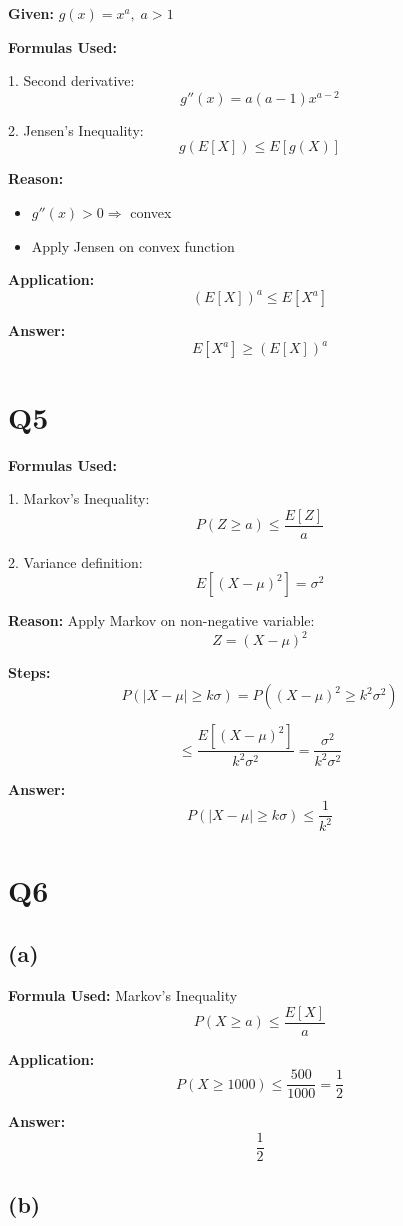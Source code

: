 \documentclass[12pt]{article}
\begin{document}
\textbf{Given:} $g(x) = x^a,\; a > 1$

\textbf{Formulas Used:}

1. Second derivative:
\[
g''(x) = a(a-1)x^{a-2}
\]

2. Jensen’s Inequality:
\[
g(E[X]) \le E[g(X)]
\]

\textbf{Reason:}
\begin{itemize}
\item $g''(x) > 0 \Rightarrow$ convex
\item Apply Jensen on convex function
\end{itemize}

\textbf{Application:}
\[
(E[X])^a \le E[X^a]
\]

\textbf{Answer:}
\[
E[X^a] \ge (E[X])^a
\]

\section*{Q5}

\textbf{Formulas Used:}

1. Markov’s Inequality:
\[
P(Z \ge a) \le \frac{E[Z]}{a}
\]

2. Variance definition:
\[
E[(X-\mu)^2] = \sigma^2
\]

\textbf{Reason:} Apply Markov on non-negative variable:
\[
Z = (X - \mu)^2
\]

\textbf{Steps:}
\[
P(|X - \mu| \ge k\sigma) = P((X-\mu)^2 \ge k^2\sigma^2)
\]

\[
\le \frac{E[(X-\mu)^2]}{k^2\sigma^2} = \frac{\sigma^2}{k^2\sigma^2}
\]

\textbf{Answer:}
\[
P(|X - \mu| \ge k\sigma) \le \frac{1}{k^2}
\]

\section*{Q6}

\subsection*{(a)}

\textbf{Formula Used:} Markov’s Inequality
\[
P(X \ge a) \le \frac{E[X]}{a}
\]

\textbf{Application:}
\[
P(X \ge 1000) \le \frac{500}{1000} = \frac{1}{2}
\]

\textbf{Answer:}
\[
\frac{1}{2}
\]

\subsection*{(b)}
\end{document}
